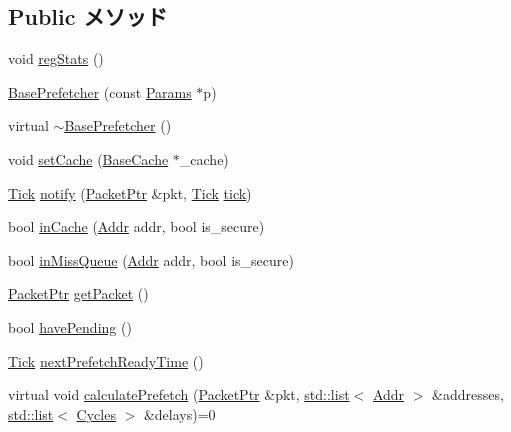 \subsection*{Public メソッド}
\begin{DoxyCompactItemize}
\item 
void \hyperlink{classBasePrefetcher_a4dc637449366fcdfc4e764cdf12d9b11}{regStats} ()
\item 
\hyperlink{classBasePrefetcher_aff313fac14ed758d8896572ecb0b6bfe}{BasePrefetcher} (const \hyperlink{classBasePrefetcher_a46661f02a5642b04fd4e12f645ad9c5c}{Params} $\ast$p)
\item 
virtual \hyperlink{classBasePrefetcher_a36880a63235082d98e72895db229946f}{$\sim$BasePrefetcher} ()
\item 
void \hyperlink{classBasePrefetcher_a6a5d34a51c5ba1c4f87dbcc59e8b13fb}{setCache} (\hyperlink{classBaseCache}{BaseCache} $\ast$\_\-cache)
\item 
\hyperlink{base_2types_8hh_a5c8ed81b7d238c9083e1037ba6d61643}{Tick} \hyperlink{classBasePrefetcher_a1d4199bee2a7f9e8f22bf9e84d5ceda4}{notify} (\hyperlink{classPacket}{PacketPtr} \&pkt, \hyperlink{base_2types_8hh_a5c8ed81b7d238c9083e1037ba6d61643}{Tick} \hyperlink{classClockedObject_a4daae57fbf09ee5423d123f5ce330e92}{tick})
\item 
bool \hyperlink{classBasePrefetcher_a1c1743bff8e77d48e43b38e1b8bcb7e6}{inCache} (\hyperlink{base_2types_8hh_af1bb03d6a4ee096394a6749f0a169232}{Addr} addr, bool is\_\-secure)
\item 
bool \hyperlink{classBasePrefetcher_a7101ac3ce053ea800e49a4ff44c84ca0}{inMissQueue} (\hyperlink{base_2types_8hh_af1bb03d6a4ee096394a6749f0a169232}{Addr} addr, bool is\_\-secure)
\item 
\hyperlink{classPacket}{PacketPtr} \hyperlink{classBasePrefetcher_a248e1528ea5a374640182955f4793d3f}{getPacket} ()
\item 
bool \hyperlink{classBasePrefetcher_a1ea6e3ce1b4860ce7b2da36b169e6ff5}{havePending} ()
\item 
\hyperlink{base_2types_8hh_a5c8ed81b7d238c9083e1037ba6d61643}{Tick} \hyperlink{classBasePrefetcher_a7b66a659d072bb2b2e105351949f7b2e}{nextPrefetchReadyTime} ()
\item 
virtual void \hyperlink{classBasePrefetcher_a3db7131bcae7e87e8146195a6e8be817}{calculatePrefetch} (\hyperlink{classPacket}{PacketPtr} \&pkt, \hyperlink{classstd_1_1list}{std::list}$<$ \hyperlink{base_2types_8hh_af1bb03d6a4ee096394a6749f0a169232}{Addr} $>$ \&addresses, \hyperlink{classstd_1_1list}{std::list}$<$ \hyperlink{classCycles}{Cycles} $>$ \&delays)=0

\end{DoxyCompactItemize}
